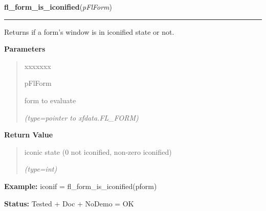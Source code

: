 \hspace{.8\funcindent}\begin{boxedminipage}{\funcwidth}

    \raggedright \textbf{fl\_form\_is\_iconified}(\textit{pFlForm})

    \vspace{-1.5ex}

    \rule{\textwidth}{0.5\fboxrule}
\setlength{\parskip}{2ex}
    Returns if a form's window is in iconified state or not.

\setlength{\parskip}{1ex}
      \textbf{Parameters}
      \vspace{-1ex}

      \begin{quote}
        \begin{Ventry}{xxxxxxx}

          \item[pFlForm]

          form to evaluate

            {\it (type=pointer to xfdata.FL\_FORM)}

        \end{Ventry}

      \end{quote}

      \textbf{Return Value}
    \vspace{-1ex}

      \begin{quote}
      iconic state (0 not iconified, non-zero iconified)

      {\it (type=int)}

      \end{quote}

\textbf{Example:} iconif = fl\_form\_is\_iconified(pform)



\textbf{Status:} Tested + Doc + NoDemo = OK



    \end{boxedminipage}

    \label{xformslib:flbasic:fl_register_raw_callback}

    \vspace{0.5ex}

